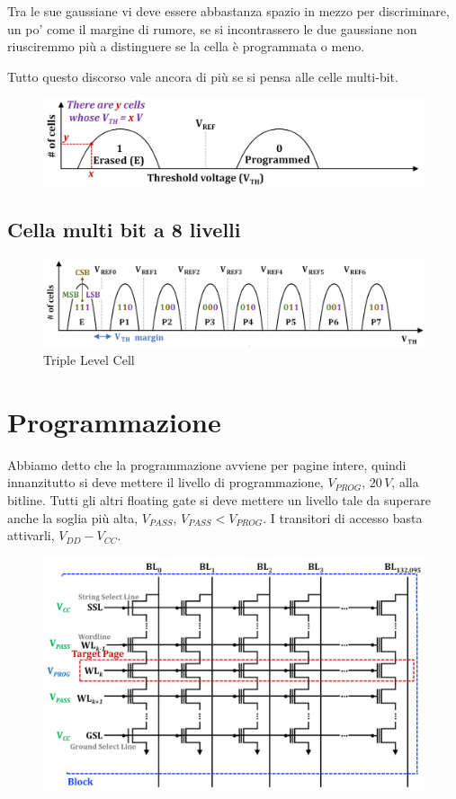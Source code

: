 Tra le sue gaussiane vi deve essere abbastanza spazio in mezzo per discriminare, un po' come il margine di rumore, se si incontrassero le due gaussiane non riusciremmo più a distinguere se la cella è programmata o meno.

Tutto questo discorso vale ancora di più se si pensa alle celle multi-bit.

\begin{figure}[htbp]
    \centering
    \includegraphics[width=0.65\linewidth]{img/Immagine 2024-05-21 185733.png}
\end{figure}



\subsection{Cella multi bit a 8 livelli}

\begin{figure}[htbp]
    \centering
    \includegraphics[width=0.65\linewidth]{img/fdsbbfsg.png}
    \caption{Triple Level Cell}
\end{figure}

\section{Programmazione}

Abbiamo detto che la programmazione avviene per pagine intere, quindi innanzitutto si deve mettere il livello di programmazione, $V_{PROG}$, $20\,V$, alla bitline. Tutti gli altri floating gate si deve mettere un livello tale da superare anche la soglia più alta, $V_{PASS}$, $V_{PASS} < V_{PROG}$. I transitori di accesso basta attivarli, $V_{DD}-V_{CC}$.



\begin{figure}[htbp]
    \centering
    \includegraphics[width=0.65\linewidth]{img/aejmt.png}
\end{figure}


